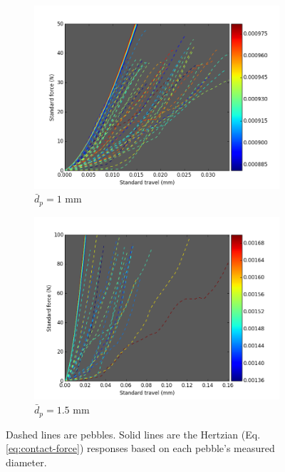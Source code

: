 \begin{figure}
        \centering
        \begin{subfigure}[b]{\imagewidth}
                \includegraphics[width=\textwidth]{chapters/figures/nfri-1mm-data-w-ideal-hertz.png}
                \caption{$\bar{d}_p = 1$ mm}
                \label{fig:nfri-1-exp-colormap}
        \end{subfigure}

        \begin{subfigure}[b]{\imagewidth}
                \includegraphics[width=\textwidth]{chapters/figures/nfri-1.5mm-data-w-ideal-hertz.png}
                \caption{$\bar{d}_p = 1.5$ mm}
                \label{fig:nfri-1.5-exp-colormap}
        \end{subfigure}
        \caption{Dashed lines are \lit pebbles. Solid lines are the Hertzian (Eq.\ref{eq:contact-force}) responses based on each pebble's measured diameter.}\label{fig:nfri-exp-curves}
\end{figure}



